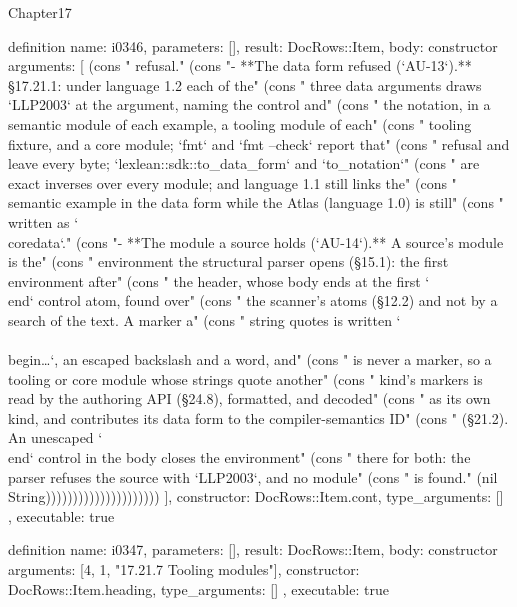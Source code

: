 \begin{lexlean}{Chapter17}
\begin{semanticmodule}
definition{
  name: i0346,
  parameters: [],
  result: DocRows::Item,
  body: constructor{
    arguments: [
      (cons "  refusal." (cons "- **The data form refused (`AU-13`).** §17.21.1: under language 1.2 each of the" (cons "  three data arguments draws `LLP2003` at the argument, naming the control and" (cons "  the notation, in a semantic module of each example, a tooling module of each" (cons "  tooling fixture, and a core module; `fmt` and `fmt --check` report that" (cons "  refusal and leave every byte; `lexlean::sdk::to_data_form` and `to_notation`" (cons "  are exact inverses over every module; and language 1.1 still links the" (cons "  semantic example in the data form while the Atlas (language 1.0) is still" (cons "  written as `\\coredata`." (cons "- **The module a source holds (`AU-14`).** A source's module is the" (cons "  environment the structural parser opens (§15.1): the first environment after" (cons "  the header, whose body ends at the first `\\end` control atom, found over" (cons "  the scanner's atoms (§12.2) and not by a search of the text. A marker a" (cons "  string quotes is written `\\\\begin{…}`, an escaped backslash and a word, and" (cons "  is never a marker, so a tooling or core module whose strings quote another" (cons "  kind's markers is read by the authoring API (§24.8), formatted, and decoded" (cons "  as its own kind, and contributes its data form to the compiler-semantics ID" (cons "  (§21.2). An unescaped `\\end` control in the body closes the environment" (cons "  there for both: the parser refuses the source with `LLP2003`, and no module" (cons "  is found." (nil String)))))))))))))))))))))
    ],
    constructor: DocRows::Item.cont,
    type_arguments: []
  },
  executable: true
}

definition{
  name: i0347,
  parameters: [],
  result: DocRows::Item,
  body: constructor{
    arguments: [4, 1, "17.21.7 Tooling modules"],
    constructor: DocRows::Item.heading,
    type_arguments: []
  },
  executable: true
}


\end{semanticmodule}
\end{lexlean}

